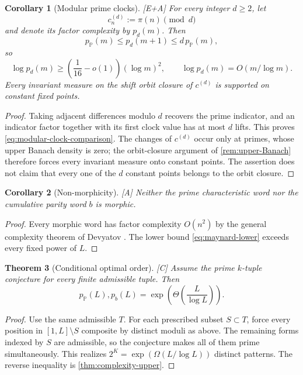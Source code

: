 \documentclass[11pt]{article}
\newtheorem{theorem}{Theorem}[section]
\newtheorem{corollary}[theorem]{Corollary}
\theoremstyle{definition}
\theoremstyle{remark}
\newcommand{\PP}{\mathbb P}
\newcommand{\status}[1]{\textnormal{\textcolor{accent}{\footnotesize[#1]}}}
\begin{document}
\begin{corollary}[Modular prime clocks]\label{cor:modular-clocks}
\status{E+A}
For every integer $d\ge2$, let
\[
 c_n^{(d)}:=\pi(n)\pmod d
\]
and denote its factor complexity by $p_d(m)$.  Then
\begin{equation}\label{eq:modular-clock-comparison}
 p_{\PP}(m)\le p_d(m+1)\le d\,p_{\PP}(m),
\end{equation}
so
\[
 \log p_d(m)\ge
 \left(\frac1{16}-o(1)\right)(\log m)^2,
 \qquad
 \log p_d(m)=O(m/\log m).
\]
Every invariant measure on the shift orbit closure of $c^{(d)}$ is supported on
constant fixed points.
\end{corollary}

\begin{proof}
Taking adjacent differences modulo $d$ recovers the prime indicator, and an indicator
factor together with its first clock value has at most $d$ lifts.  This proves
\eqref{eq:modular-clock-comparison}.  The changes of $c^{(d)}$ occur only at primes,
whose upper Banach density is zero; the orbit-closure argument of
\cref{rem:upper-Banach} therefore forces every invariant measure onto constant points.
The assertion does not claim that every one of the $d$ constant points belongs to the
orbit closure.
\end{proof}

\begin{corollary}[Non-morphicity]\label{cor:nonmorphic}
\status{A}
Neither the prime characteristic word nor the cumulative parity word $b$ is morphic.
\end{corollary}

\begin{proof}
Every morphic word has factor complexity $O(n^2)$ by the general complexity theorem of
Devyatov \cite{Devyatov}.  The lower bound \eqref{eq:maynard-lower} exceeds every fixed
power of $L$.
\end{proof}

\begin{theorem}[Conditional optimal order]\label{thm:conditional-complexity}
\status{C}
Assume the prime $k$-tuple conjecture for every finite admissible tuple.  Then
\[
 p_{\PP}(L),p_b(L)=
 \exp\!\left(\Theta\!\left(\frac{L}{\log L}\right)\right).
\]
\end{theorem}

\begin{proof}
Use the same admissible $T$.  For each prescribed subset $S\subset T$, force every
position in $[1,L]\setminus S$ composite by distinct moduli as above.  The remaining
forms indexed by $S$ are admissible, so the conjecture makes all of them prime
simultaneously.  This realizes $2^K=\exp(\Omega(L/\log L))$ distinct patterns.  The
reverse inequality is \cref{thm:complexity-upper}.
\end{proof}
\end{document}
